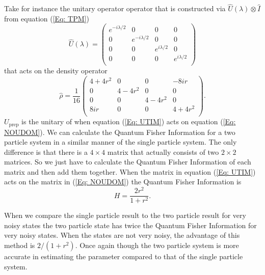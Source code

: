 \documentclass[twocolumn]{article}
\begin{document}
\par \noindent 
Take for instance the unitary operator operator that is constructed via $\hat{U}(\lambda)\otimes\hat{I}$ from equation (\ref{Eq: TPM})
\begin{equation} \label{Eq: UTIM}
\hat{U}(\lambda)=
\left(\begin{array}{cccc}
e^{-i\lambda/2} & 0 & 0 & 0 \\
0 & e^{-i\lambda/2} & 0 & 0 \\
0 & 0 & e^{i\lambda/2} & 0 \\
0 & 0 & 0 & e^{i\lambda/2} \\
\end{array}\right)
\end{equation}
that acts on the density operator
\begin{equation} \label{Eq: NOUDOM}
\hat{\rho}=\frac{1}{16}
\left(\begin{array}{cccc}
4+4r^2 & 0 & 0 & -8ir \\
0 & 4-4r^2 & 0 & 0 \\
0 & 0 & 4-4r^2 & 0 \\
8ir & 0 & 0 & 4+4r^2 \\
\end{array}\right).
\end{equation}
$U_{\text{prep}}$ is the unitary of when equation (\ref{Eq: UTIM}) acts on equation (\ref{Eq: NOUDOM}). We can calculate the Quantum Fisher Information for a two particle system in a similar manner of the single particle system. The only difference is that there is a $4\times4$ matrix that actually consists of two $2\times2$ matrices. So we just have to calculate the Quantum Fisher Information of each matrix and then add them together. When the matrix in equation (\ref{Eq: UTIM}) acts on the matrix in (\ref{Eq: NOUDOM}) the Quantum Fisher Information is
\begin{equation} \label{Eq: NSUDOQFI}
H=\frac{2r^2}{1+r^2}.
\end{equation}

When we compare the single particle result to the two particle result for very noisy states the two particle state has twice the Quantum Fisher Information for very noisy states. When the states are not very noisy, the advantage of this method is $2/(1+r^2)$. Once again though the two particle system is more accurate in estimating the parameter compared to that of the single particle system. 
\end{document}
